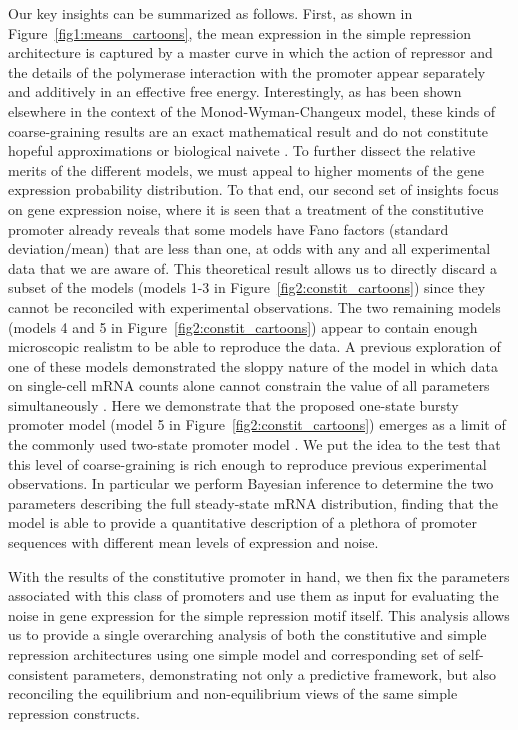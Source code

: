 Our key insights can be summarized as follows. First, as shown in 
Figure~\ref{fig1:means_cartoons}, the mean expression in the simple repression
architecture is captured by a master curve in which the action of repressor and
the details of the polymerase interaction with the promoter appear separately
and additively in an effective free energy. Interestingly, as has been shown
elsewhere in the context of the Monod-Wyman-Changeux model, these kinds of
coarse-graining results are an exact mathematical result and do not constitute
hopeful approximations or biological naivete \cite{Razo-Mejia2018, Chure2019}.
To further dissect the relative merits of the different models, we must appeal
to higher moments of the gene expression probability distribution. To that end,
our second set of insights focus on gene expression noise, where it is seen that
a treatment of the constitutive promoter already reveals that some models have
Fano factors (standard deviation/mean) that are less than one, at odds with
any and all experimental data that we are aware of.
This theoretical result allows us to directly discard a subset of the models
(models 1-3 in Figure~\ref{fig2:constit_cartoons}) since they cannot be
reconciled with experimental observations. The two remaining models (models 4 and 5
in Figure~\ref{fig2:constit_cartoons}) appear to contain enough microscopic
realistm to be able to reproduce the data. A previous exploration of one 
of these models demonstrated the sloppy nature of the model in which data on single-cell
mRNA counts alone cannot constrain the value of all parameters 
simultaneously \cite{Razo-Mejia2020}. Here we demonstrate that the proposed
one-state bursty promoter model (model 5 in 
Figure~\ref{fig2:constit_cartoons}) emerges as  a limit of the commonly used
two-state promoter model \cite{Peccoud1995}. We put  the idea to the test that this
level of coarse-graining is rich enough to reproduce previous 
experimental observations. In particular we perform Bayesian inference to determine the
two parameters describing the full steady-state mRNA distribution, finding that
the model is able to provide a quantitative description of  a plethora of promoter sequences with different
mean levels of expression and noise.


With the results of the constitutive promoter in hand, we then fix the parameters
associated with this class of promoters and use them as input for evaluating
the noise in gene expression for the simple repression motif itself.  This analysis
allows us to provide a single overarching analysis of both the constitutive
and simple repression architectures using one simple model and
corresponding set of self-consistent parameters, demonstrating not only
a predictive framework, but also reconciling the equilibrium and non-equilibrium
views of the same simple repression constructs.

